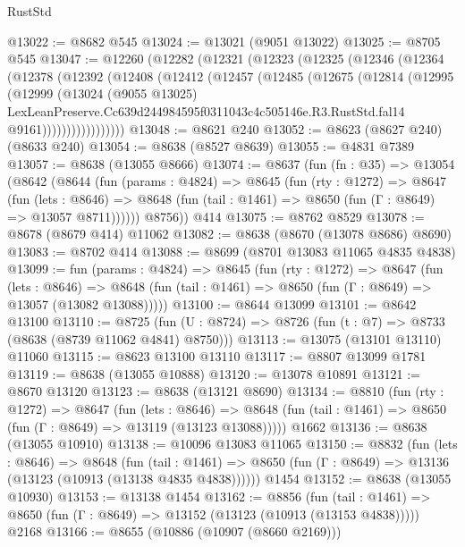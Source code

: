 \begin{lexlean}{RustStd}
\begin{coremodule}
@13022 := @8682 @545
@13024 := @13021 (@9051 @13022)
@13025 := @8705 @545
@13047 := @12260
    (@12282
      (@12321
        (@12323
          (@12325
            (@12346
              (@12364
                (@12378
                  (@12392
                    (@12408
                      (@12412
                        (@12457
                          (@12485
                            (@12675
                              (@12814
                                (@12995
                                  (@12999
                                    (@13024
                                      (@9055 @13025)
                                      LexLeanPreserve.Cc639d244984595f0311043c4c505146e.R3.RustStd.fal14
                                      @9161)))))))))))))))))
@13048 := @8621 @240
@13052 := @8623 (@8627 @240) (@8633 @240)
@13054 := @8638 (@8527 @8639)
@13055 := @4831 @7389
@13057 := @8638 (@13055 @8666)
@13074 := @8637
    (fun (fn : @35) =>
    @13054
      (@8642
        (@8644
          (fun (params : @4824) =>
          @8645
            (fun (rty : @1272) =>
            @8647
              (fun (lets : @8646) =>
              @8648 (fun (tail : @1461) => @8650 (fun (Γ : @8649) => @13057 @8711))))))
        @8756))
    @414
@13075 := @8762 @8529
@13078 := @8678 (@8679 @414) @11062
@13082 := @8638 (@8670 (@13078 @8686) @8690)
@13083 := @8702 @414
@13088 := @8699 (@8701 @13083 @11065 @4835 @4838)
@13099 := fun (params : @4824) =>
  @8645
    (fun (rty : @1272) =>
    @8647
      (fun (lets : @8646) =>
      @8648 (fun (tail : @1461) => @8650 (fun (Γ : @8649) => @13057 (@13082 @13088)))))
@13100 := @8644 @13099
@13101 := @8642 @13100
@13110 := @8725
    (fun (U : @8724) => @8726 (fun (t : @7) => @8733 (@8638 (@8739 @11062 @4841) @8750)))
@13113 := @13075 (@13101 @13110) @11060
@13115 := @8623 @13100 @13110
@13117 := @8807 @13099 @1781
@13119 := @8638 (@13055 @10888)
@13120 := @13078 @10891
@13121 := @8670 @13120
@13123 := @8638 (@13121 @8690)
@13134 := @8810
    (fun (rty : @1272) =>
    @8647
      (fun (lets : @8646) =>
      @8648 (fun (tail : @1461) => @8650 (fun (Γ : @8649) => @13119 (@13123 @13088)))))
    @1662
@13136 := @8638 (@13055 @10910)
@13138 := @10096 @13083 @11065
@13150 := @8832
    (fun (lets : @8646) =>
    @8648
      (fun (tail : @1461) =>
      @8650 (fun (Γ : @8649) => @13136 (@13123 (@10913 (@13138 @4835 @4838))))))
    @1454
@13152 := @8638 (@13055 @10930)
@13153 := @13138 @1454
@13162 := @8856
    (fun (tail : @1461) => @8650 (fun (Γ : @8649) => @13152 (@13123 (@10913 (@13153 @4838)))))
    @2168
@13166 := @8655 (@10886 (@10907 (@8660 @2169)))

\end{coremodule}
\end{lexlean}
